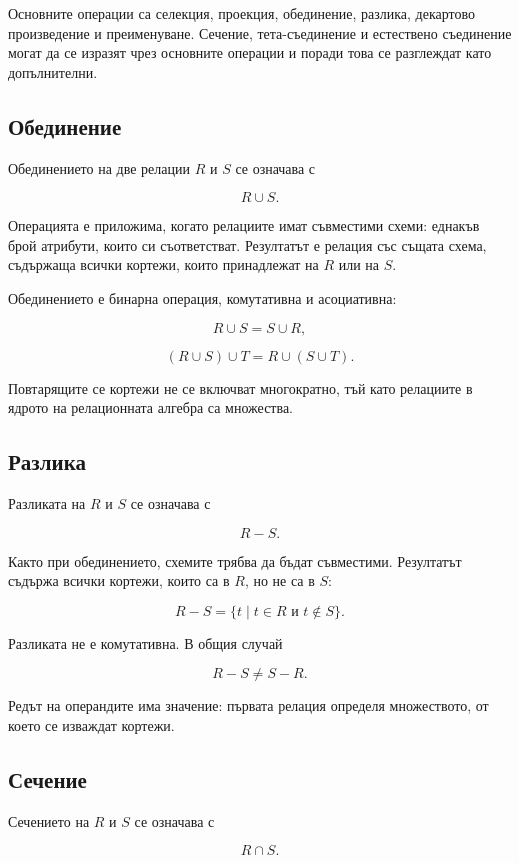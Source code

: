 Основните операции са селекция, проекция, обединение, разлика, декартово произведение и преименуване. Сечение, тета-съединение и естествено съединение могат да се изразят чрез основните операции и поради това се разглеждат като допълнителни.

\subsection{Обединение}\label{s:23.4.1}

Обединението на две релации $R$ и $S$ се означава с

\[
R\cup S.
\]

Операцията е приложима, когато релациите имат съвместими схеми: еднакъв брой атрибути, които си съответстват. Резултатът е релация със същата схема, съдържаща всички кортежи, които принадлежат на $R$ или на $S$.

Обединението е бинарна операция, комутативна и асоциативна:

\[
R\cup S=S\cup R,
\]

\[
(R\cup S)\cup T=R\cup(S\cup T).
\]

Повтарящите се кортежи не се включват многократно, тъй като релациите в ядрото на релационната алгебра са множества.

\subsection{Разлика}\label{s:23.4.2}

Разликата на $R$ и $S$ се означава с

\[
R-S.
\]

Както при обединението, схемите трябва да бъдат съвместими. Резултатът съдържа всички кортежи, които са в $R$, но не са в $S$:

\[
R-S=\{t\mid t\in R \text{ и } t\notin S\}.
\]

Разликата не е комутативна. В общия случай

\[
R-S\neq S-R.
\]

Редът на операндите има значение: първата релация определя множеството, от което се изваждат кортежи.

\subsection{Сечение}\label{s:23.4.3}

Сечението на $R$ и $S$ се означава с

\[
R\cap S.
\]

